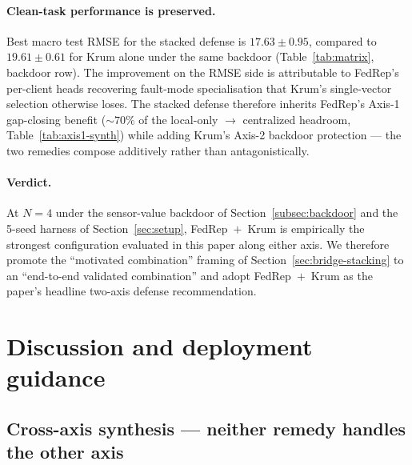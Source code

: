 \documentclass[preprint,12pt,authoryear]{elsarticle}
\begin{document}
\paragraph{Clean-task performance is preserved.}
Best macro test RMSE for the stacked defense is $17.63 \pm 0.95$,
compared to $19.61 \pm 0.61$ for Krum alone under the same
backdoor (Table~\ref{tab:matrix}, backdoor row). The improvement on
the RMSE side is attributable to FedRep's per-client heads recovering
fault-mode specialisation that Krum's single-vector selection
otherwise loses. The stacked defense therefore inherits FedRep's
Axis-1 gap-closing benefit ($\sim 70\%$ of the local-only $\to$
centralized headroom, Table~\ref{tab:axis1-synth}) while adding
Krum's Axis-2 backdoor protection --- the two remedies compose
additively rather than antagonistically.

\paragraph{Verdict.}
At $N = 4$ under the sensor-value backdoor of
Section~\ref{subsec:backdoor} and the 5-seed harness of
Section~\ref{sec:setup}, FedRep~$+$~Krum is empirically the
strongest configuration evaluated in this paper along either axis.
We therefore promote the ``motivated combination'' framing of
Section~\ref{sec:bridge-stacking} to an ``end-to-end validated
combination'' and adopt FedRep~$+$~Krum as the paper's headline
two-axis defense recommendation.



\section{Discussion and deployment guidance}
\label{sec:discuss}

\subsection{Cross-axis synthesis --- neither remedy handles the other axis}
\label{sec:discuss-synthesis}
\end{document}
